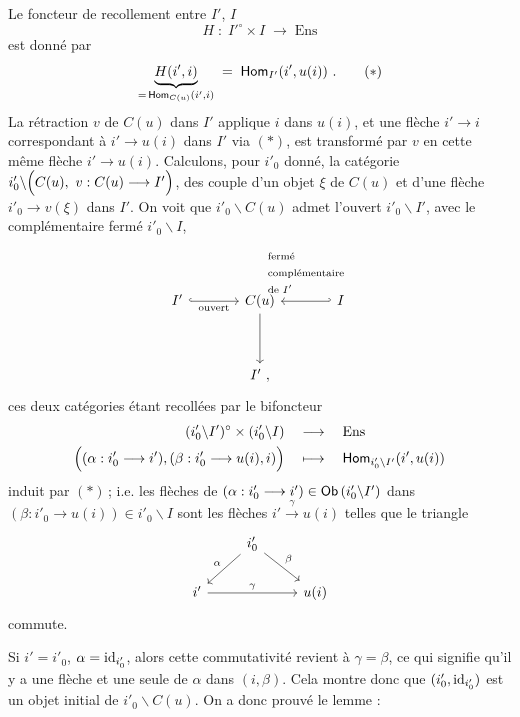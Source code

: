 Le foncteur de recollement entre $I'$, $I$
\[
H \;:\; I'^\circ\times I \;\longrightarrow\; \mathrm{Ens}
\]
est donné par
\[
\underbrace{H(i',i)}_{=\,\Hom_{C(u)}(i',i)} \;=\; \Hom_{I'}(i',u(i))\ . \tag*{$(*)$}
\]
La rétraction $v$ de $C(u)$ dans $I'$ applique $i$ dans $u(i)$, et une flèche $i'\longrightarrow i$ correspondant à $i'\longrightarrow u(i)$ dans $I'$ via $(*)$, est transformé par $v$ en cette même flèche $i'\longrightarrow u(i)$. Calculons, %
pour $i'_0$ donné, la catégorie $i'_0\backslash\Bigl(C(u),\ v : C(u)\longrightarrow I'\Bigr)$, des couple d'un objet $\xi$ de $C(u)$ %
et d'une flèche $i'_0\longrightarrow v(\xi)$ dans $I'$. On voit que $i'_0\backslash C(u)$ admet l'ouvert $i'_0\backslash I'$, avec le complémentaire fermé $i'_0\backslash I$,
\[
\begin{tikzcd}[column sep=large, row sep=huge]
I' \arrow[r, hook, "\text{ouvert}"'] & C(u) \arrow[d] & I \arrow[l, hook', "\begin{array}{l}\text{fermé}\\ \text{complémentaire}\\ \text{de } I'\end{array}"'] \\
 & I'\ ,
\end{tikzcd}
\]
ces deux catégories étant recollées par le bifoncteur
\[
\begin{aligned}
(i'_0\backslash I')^\circ \times (i'_0\backslash I) &\quad\longrightarrow\quad \mathrm{Ens}\\
\Bigl((\alpha : i'_0\longrightarrow i'), (\beta : i'_0\longrightarrow u(i), i)\Bigr) &\quad\longmapsto\quad \mathsf{Hom}_{i'_0\backslash I'}(i',u(i))
\end{aligned}
\]
induit par $(*)$\,; i.e. les flèches de $(\alpha : i'_0\longrightarrow i') \in \mathsf{Ob}\,(i'_0\backslash I')$ dans $(\beta : i'_0\longrightarrow u(i)) \in i'_0\backslash I$ sont les flèches $i' \xrightarrow{\gamma} u(i)$ telles que le triangle
\[
\begin{tikzcd}
 & i'_0 \arrow[dl, "\alpha"'] \arrow[dr, "\beta"] & \\
i' \arrow[rr, "\gamma"] & & u(i)
\end{tikzcd}
\]
commute.

Si $i' = i'_0$, $\alpha = \mathrm{id}_{i'_0}$, alors cette commutativité revient à $\gamma = \beta$, ce qui signifie qu'il y a une flèche et une seule de $\alpha$ dans $(i,\beta)$. Cela montre donc que $(i'_0,\mathrm{id}_{i'_0})$ est un objet initial de $i'_0\backslash C(u)$. On a donc prouvé le lemme :

